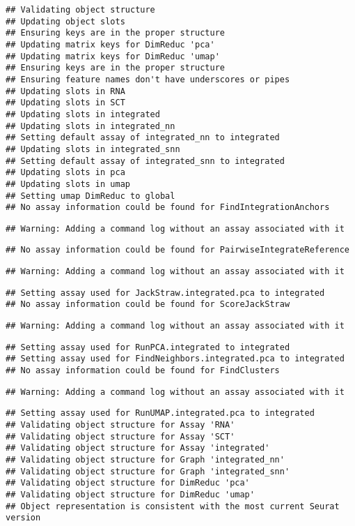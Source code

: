 \documentclass[
]{article}
\begin{document}
\begin{verbatim}
## Validating object structure
## Updating object slots
## Ensuring keys are in the proper structure
## Updating matrix keys for DimReduc 'pca'
## Updating matrix keys for DimReduc 'umap'
## Ensuring keys are in the proper structure
## Ensuring feature names don't have underscores or pipes
## Updating slots in RNA
## Updating slots in SCT
## Updating slots in integrated
## Updating slots in integrated_nn
## Setting default assay of integrated_nn to integrated
## Updating slots in integrated_snn
## Setting default assay of integrated_snn to integrated
## Updating slots in pca
## Updating slots in umap
## Setting umap DimReduc to global
## No assay information could be found for FindIntegrationAnchors
\end{verbatim}

\begin{verbatim}
## Warning: Adding a command log without an assay associated with it
\end{verbatim}

\begin{verbatim}
## No assay information could be found for PairwiseIntegrateReference
\end{verbatim}

\begin{verbatim}
## Warning: Adding a command log without an assay associated with it
\end{verbatim}

\begin{verbatim}
## Setting assay used for JackStraw.integrated.pca to integrated
## No assay information could be found for ScoreJackStraw
\end{verbatim}

\begin{verbatim}
## Warning: Adding a command log without an assay associated with it
\end{verbatim}

\begin{verbatim}
## Setting assay used for RunPCA.integrated to integrated
## Setting assay used for FindNeighbors.integrated.pca to integrated
## No assay information could be found for FindClusters
\end{verbatim}

\begin{verbatim}
## Warning: Adding a command log without an assay associated with it
\end{verbatim}

\begin{verbatim}
## Setting assay used for RunUMAP.integrated.pca to integrated
## Validating object structure for Assay 'RNA'
## Validating object structure for Assay 'SCT'
## Validating object structure for Assay 'integrated'
## Validating object structure for Graph 'integrated_nn'
## Validating object structure for Graph 'integrated_snn'
## Validating object structure for DimReduc 'pca'
## Validating object structure for DimReduc 'umap'
## Object representation is consistent with the most current Seurat version
\end{verbatim}
\end{document}
